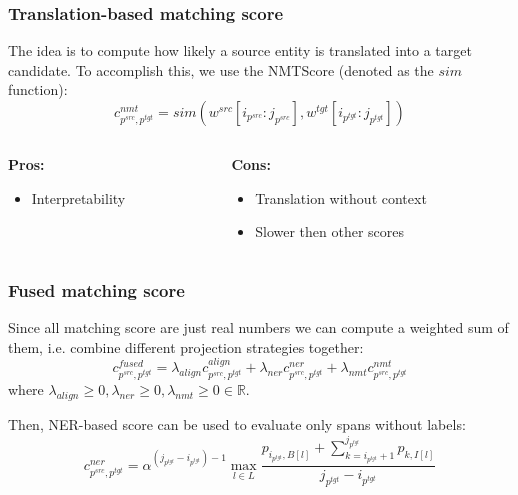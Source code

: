 \documentclass{beamer}
\newcommand{\src}[1]{#1^{src}}
\newcommand{\tgt}[1]{#1^{tgt}}
\begin{document}
\begin{frame}
  \frametitle{Translation-based matching score}
  The idea is to compute how likely a source entity is translated into a target
  candidate. To accomplish this, we use the NMTScore (denoted as the \( sim \) function):
  \begin{equation*}
    c_{\src{p}, \tgt{p}}^{nmt} =
    sim \left(\src{w}[i_{\src{p}} : j_{\src{p}}],
    \tgt{w}[i_{\tgt{p}} : j_{\tgt{p}}] \right)
  \end{equation*}

  \vspace*{0.2cm}
  \begin{columns}
    \begin{column}[t]{.5\textwidth}
      \centering \textbf{Pros:}
      \begin{itemize}
        \item Interpretability
      \end{itemize}
    \end{column}
    \begin{column}[t]{.5\textwidth}
      \centering \textbf{Cons:}
      \begin{itemize}
        \item Translation without context
        \item Slower then other scores
      \end{itemize}
    \end{column}
  \end{columns}
\end{frame}

\begin{frame}
  \frametitle{Fused matching score}
  Since all matching score are just real numbers we can compute a weighted sum of them,
  i.e. combine different projection strategies together:
  \begin{equation*}
    c_{\src{p}, \tgt{p}}^{fused} =
    \lambda_{align} c_{\src{p}, \tgt{p}}^{align} +
    \lambda_{ner} c_{\src{p}, \tgt{p}}^{ner} +
    \lambda_{nmt} c_{\src{p}, \tgt{p}}^{nmt}
  \end{equation*}
  where \( \lambda_{align} \geq 0, \lambda_{ner} \geq 0, \lambda_{nmt} \geq 0 \in \mathbb{R}\).

  \vspace*{0.3cm}
  Then, NER-based score can be used to evaluate only spans without labels:
  \begin{equation*}
    c_{\src{p}, \tgt{p}}^{ner} = \alpha^{(j_{\tgt{p}} - i_{\tgt{p}}) - 1}
    \max\limits_{l \in L}
    \frac{
      p_{i_{\tgt{p}}, B[l]} +
      \sum\limits_{k = i_{\tgt{p}} + 1}^{j_{\tgt{p}}} p_{k, I[l]}
    }
    {j_{\tgt{p}} - i_{\tgt{p}}}
  \end{equation*}
\end{frame}
\end{document}

